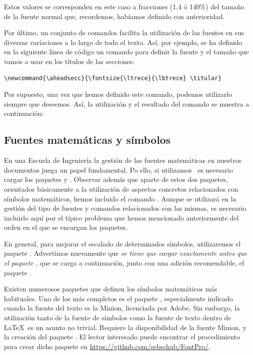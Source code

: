Estos valores se corresponden  en este caso a fracciones (1,4 ó 140\%) del tamaño de la fuente normal que, recordemos, habíamos definido con anterioridad.

Por último, un conjunto de comandos facilita la utilización de las fuentes en sus diversas variaciones a lo largo de todo el texto. Así, por ejemplo, se ha definido en la siguiente línea de código un comando para definir la fuente y el tamaño que vamos a usar en los títulos de las secciones:
\begin{lstlisting}[frame=none]
\newcommand{\aheadsecc}{\fontsize{\ltrece}{\lbtrece} \titular}
\end{lstlisting}

Por supuesto, una vez que hemos definido este comando, podemos utilizarlo siempre que deseemos. Así, la utilización y el resultado del comando  se muestra a continuación:
\begin{LTXexample}[pos=r, hsep=15pt,width=0.45\textwidth]
\end{LTXexample}

\subsection{Fuentes matemáticas y símbolos}
En una Escuela de Ingeniería la gestión de las fuentes matemáticas en nuestros documentos juega un papel fundamental. Po ello, si utilizamos \LuaLaTeX\ es necesario cargar los paquetes  y . Observar además que aparte de estos dos paquetes, orientados básicamente a la utilización de aspectos concretos relacionados con símbolos matemáticos, hemos incluido el comando . Aunque  se utilizará en la gestión del tipo de fuentes y comandos relacionados con las mismas, es necesario incluirlo aquí por el típico problema que hemos mencionado anteriormente del orden en el que se encargan los paquetes.

En general, para mejorar el escalado de determinados símbolos, utilizaremos el paquete . Advertimos nuevamente que \emph{se tiene que cargar exactamente antes que el paquete }, que se carga a continuación, junto con una adición recomendable, el paquete .

Existen numerosos paquetes que definen los símbolos matemáticos más habituales. Uno de los más completos es el paquete , especialmente indicado cuando la fuente del texto es la Minion, licenciada por Adobe. Sin embargo, la utilización tanto de la fuente de símbolos como la fuente de texto dentro de \LaTeX\ es un asunto no trivial. Requiere la disponibilidad de la fuente Minion, y la creación del  paquete . El lector interesado puede encontrar el procedimiento para crear dicho paquete en \url{https://github.com/sebschub/FontPro/}.

